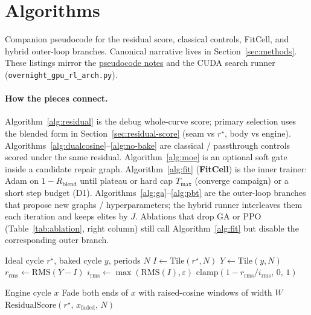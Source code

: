 \section{Algorithms}
\label{app:algorithms}

Companion pseudocode for the residual score, classical controls, FitCell, and hybrid outer-loop branches.
Canonical narrative lives in Section~\ref{sec:methods}.
These listings mirror the
\href{https://github.com/reeldemo/denoise-opt-meta/blob/master/docs/PSEUDOCODE.md}{pseudocode notes}
and the CUDA search runner (\texttt{overnight\_gpu\_rl\_arch.py}).

\paragraph{How the pieces connect.}
Algorithm~\ref{alg:residual} is the debug whole-curve score; primary selection uses the blended form in Section~\ref{sec:residual-score} (seam vs $r^{\star}$, body vs engine).
Algorithms~\ref{alg:dualcosine}--\ref{alg:no-bake} are classical / passthrough controls scored under the same residual.
Algorithm~\ref{alg:moe} is an optional soft gate inside a candidate repair graph.
Algorithm~\ref{alg:fit} (\textbf{FitCell}) is the inner trainer: Adam on $1-R_{\mathrm{blend}}$ until plateau or hard cap $T_{\max}$ (converge campaign) or a short step budget (D1).
Algorithms~\ref{alg:ga}--\ref{alg:pbt} are the outer-loop branches that propose new graphs / hyperparameters; the hybrid runner interleaves them each iteration and keeps elites by $J$.
Ablations that drop GA or PPO (Table~\ref{tab:ablation}, right column) still call Algorithm~\ref{alg:fit} but disable the corresponding outer branch.

\begin{algorithm}[H]
\caption{ResidualScore}
\label{alg:residual}
\begin{algorithmic}[1]
\Require Ideal cycle $r^{\star}$, baked cycle $y$, periods $N$
\State $I \gets \mathrm{Tile}(r^{\star}, N)$
\State $Y \gets \mathrm{Tile}(y, N)$
\State $r_{\mathrm{rms}} \gets \mathrm{RMS}(Y-I)$
\State $i_{\mathrm{rms}} \gets \max(\mathrm{RMS}(I), \varepsilon)$
\State \Return $\mathrm{clamp}(1 - r_{\mathrm{rms}}/i_{\mathrm{rms}},\,0,\,1)$
\end{algorithmic}
\end{algorithm}
\FloatBarrier

\begin{algorithm}[H]
\caption{DualCosine baseline}
\label{alg:dualcosine}
\begin{algorithmic}[1]
\Require Engine cycle $x$
\State Fade both ends of $x$ with raised-cosine windows of width $W$
\State \Return $\mathrm{ResidualScore}(r^{\star},\,x_{\mathrm{faded}},\,N)$
\end{algorithmic}
\end{algorithm}
\FloatBarrier

